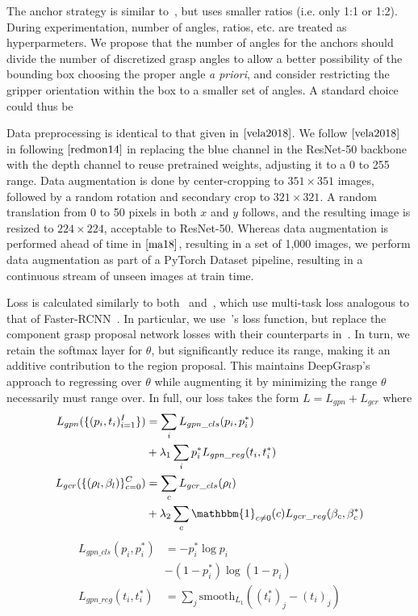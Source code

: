 \documentclass[10pt,twocolumn,letterpaper]{article}
\begin{document}
The anchor strategy is similar to~\cite{ma18}, but uses smaller ratios (i.e. only 1:1 or 1:2). During experimentation, number of angles, ratios, etc. are treated as hyperparmeters. We propose that the number of angles for the anchors should divide the number of discretized grasp angles to allow a better possibility of the bounding box choosing the proper angle \textit{a priori}, and consider restricting the gripper orientation within the box to a smaller set of angles. A standard choice could thus be 

Data preprocessing is identical to that given in $\cite{vela2018}$. We follow $\cite{vela2018}$ in following $\cite{redmon14}$ in replacing the blue channel in the ResNet-50 backbone with the depth channel to reuse pretrained weights, adjusting it to a 0 to 255 range. Data augmentation is done by center-cropping to $351 \times 351$ images, followed by a random rotation and secondary crop to $321 \times 321$. A random translation from 0 to 50 pixels in both $x$ and $y$ follows, and the resulting image is resized to $224 \times 224$, acceptable to ResNet-50. Whereas data augmentation is performed ahead of time in $\cite{ma18}$, resulting in a set of 1,000 images, we perform data augmentation as part of a PyTorch Dataset pipeline, resulting in a continuous stream of unseen images at train time. 

Loss is calculated similarly to both~\cite{vela2018} and~\cite{ma18}, which use multi-task loss analogous to that of Faster-RCNN~\cite{ren15}. In particular, we use~\cite{vela2018}'s loss function, but replace the component grasp proposal network losses with their counterparts in~\cite{ma18}. In turn, we retain the softmax layer for $\theta$, but significantly reduce its range, making it an additive contribution to the region proposal. This maintains DeepGrasp's approach to regressing over $\theta$ while augmenting it by minimizing the range $\theta$ necessarily must range over. In full, our loss takes the form $L = L_{gpn} + L_{gcr}$ where
\begin{align}
    L_{gpn}(\{(p_i, t_i)_{i=1}^I\}) &= \sum_i L_{gpn\_cls}(p_i, p_i^*)\\
    &+ \lambda_1 \sum_i p_i^* L_{gpn\_reg}(t_i, t_i^*) \nonumber\\
    L_{gcr}(\{(\rho_l, \beta_l)\}_{c=0}^C) &= \sum_c L_{gcr\_cls}(\rho_l)\\
    &+ \lambda_2 \sum_c \mathbbm{1}_{c \neq 0}(c) L_{gcr\_reg}(\beta_c, \beta_c^*) \nonumber
\end{align}
\begin{align}
    L_{gpn\_cls}(p_i, p_i^*) &= -p_i^* \log p_i\\
    &- (1-p_i^*) \log (1-p_i) \nonumber\\
    L_{gpn\_reg}(t_i, t_i^*) &= \sum_{j} \text{smooth}_{L_1}((t_i^*)_j-(t_i)_j)
\end{align}
\end{document}
